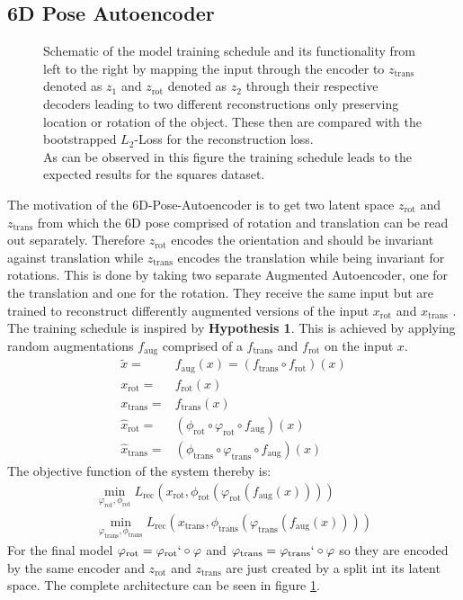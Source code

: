 \documentclass[10pt,a4paper]{article}
\newcommand{\rot}{\ensuremath{\text{rot}\xspace}}
\newcommand{\trans}{\ensuremath{\text{trans}\xspace}}
\begin{document}
\subsection{6D Pose Autoencoder}\label{6D Pose Autoencoder}
\begin{figure}[htb]
    \centering
    
    \caption{Schematic of the model training schedule and its functionality from left to the right by mapping the input through the encoder to $z_{\trans}$ denoted as $z_1$ and $z_{\rot}$ denoted as $z_2$ through their respective decoders leading to two different reconstructions only preserving location or rotation of the object. These then are compared with the bootstrapped $L_2$-Loss for the reconstruction loss.\\
    As can be observed in this figure the training schedule leads to the expected results for the squares dataset.} \label{model_square}
\end{figure}
The motivation of the 6D-Pose-Autoencoder is to get two latent space $z_{\rot}$ and $z_{\trans}$ from which the 6D pose comprised of rotation and translation can be read out separately.
Therefore $z_{\rot}$ encodes the orientation and should be invariant against translation while $z_{\trans}$ encodes the translation while being invariant for rotations. This is done by taking two separate Augmented Autoencoder, one for the translation and one for the rotation. They receive the same input but are trained to reconstruct differently augmented versions of the input $x_{\rot}$ and $x_{\trans}$ . The training schedule is inspired by \textbf{Hypothesis 1}.
This is achieved by applying random augmentations $f_{\text{aug}}$ comprised of a $f_{\trans}$ and $f_{\rot}$ on the input $x$. 
\begin{equation}
 \begin{aligned}
\tilde{x} = &f_{\text{aug}} (x) = (f_{\trans} \circ f_{\rot} ) (x) \\
x_{\rot} =&f_{\rot} (x) \\
x_{\trans} =&f_{\trans} (x) \\
\hat{x}_{\rot} =& (\phi_{\rot} \circ \varphi_{\rot} \circ f_{\text{aug}}) (x) \\
\hat{x}_{\trans} = &(\phi_{\trans} \circ \varphi_{\trans} \circ f_{\text{aug}}) (x)
\end{aligned}
\end{equation}
The objective function of the system thereby is:
\begin{equation}
 \begin{aligned}
\min_{\varphi_{\rot}, \phi_{\rot}}  L_{\text{rec}}(x_{\rot}, \phi_{\rot}(\varphi_{\rot}(f_{\text{aug}}(x) ))) \\
\min_{\varphi_{\trans}, \phi_{\trans}}  L_{\text{rec}}(x_{\trans}, \phi_{\trans}(\varphi_{\trans}(f_{\text{aug}}(x) ))) 
\end{aligned}
\end{equation}
For the final model $\varphi_{\rot} = \varphi_{\rot}` \circ \varphi$ and $\varphi_{\trans}= \varphi_{\trans}` \circ \varphi$ so they are encoded by the same encoder and $z_{\rot}$ and $z_{\trans}$ are just created by a split int its latent space. The complete architecture can be seen in figure \ref{model_square}.
\end{document}
